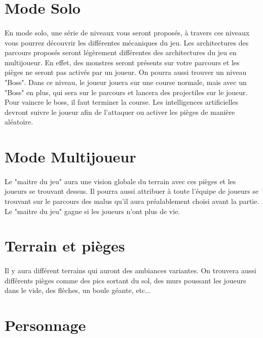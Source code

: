 \documentclass[12pt]{report}
\begin{document}
	\section{Mode Solo}
	\paragraph{}
		En mode solo, une série de niveaux vous seront proposés, à travers ces niveaux vous pourrez découvrir les différentes mécaniques du jeu. Les architectures des parcours proposés seront légèrement différentes des architectures du jeu en multijoueur. En effet, des monstres seront présents sur votre parcours et les pièges ne seront pas activés par un joueur. On pourra aussi trouver un niveau "Boss". Dans ce niveau, le joueur jouera sur une course normale, mais avec un "Boss" en plus, qui sera sur le parcours et lancera des projectiles sur le joueur. Pour vaincre le boss, il faut terminer la course. Les intelligences artificielles devront suivre le joueur afin de l'attaquer ou activer les pièges de manière aléatoire.

	\section{Mode Multijoueur}
	\paragraph{}
		Le "maitre du jeu" aura une vision globale du terrain avec ces pièges et les joueurs se trouvant dessus. Il pourra aussi attribuer à toute l'équipe de joueurs se trouvant sur le parcours des malus qu'il aura préalablement choisi avant la partie. Le "maitre du jeu" gagne si les joueurs n'ont plus de vie.
		
	\section{Terrain et pièges}
	\paragraph{}
		Il y aura différent terrains qui auront des ambiances variantes. 
		On trouvera aussi différents pièges comme des pics sortant du sol, des murs poussant les joueurs dans le vide, des flèches, un boule géante, etc...

	\section{Personnage}
\end{document}
